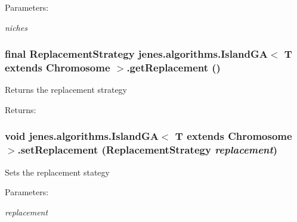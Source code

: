 \begin{Desc}
\item[Parameters:]
\begin{description}
\item[{\em niches}]\end{description}
\end{Desc}
\hypertarget{classjenes_1_1algorithms_1_1_island_g_a_3_01_t_01extends_01_chromosome_01_4_ba40738c3ed2724093a13ec8019d2e11}{
\subsubsection[getReplacement]{\setlength{\rightskip}{0pt plus 5cm}final {\bf ReplacementStrategy} jenes.algorithms.IslandGA$<$ T extends Chromosome $>$.getReplacement ()}}
\label{classjenes_1_1algorithms_1_1_island_g_a_3_01_t_01extends_01_chromosome_01_4_ba40738c3ed2724093a13ec8019d2e11}


Returns the replacement strategy \begin{Desc}
\item[Returns:]\end{Desc}
\hypertarget{classjenes_1_1algorithms_1_1_island_g_a_3_01_t_01extends_01_chromosome_01_4_980d98b95084ac99094dac0d7d231366}{
\subsubsection[setReplacement]{\setlength{\rightskip}{0pt plus 5cm}void jenes.algorithms.IslandGA$<$ T extends Chromosome $>$.setReplacement ({\bf ReplacementStrategy} {\em replacement})}}
\label{classjenes_1_1algorithms_1_1_island_g_a_3_01_t_01extends_01_chromosome_01_4_980d98b95084ac99094dac0d7d231366}


Sets the replacement stategy \begin{Desc}
\item[Parameters:]
\begin{description}
\item[{\em replacement}]\end{description}
\end{Desc}



